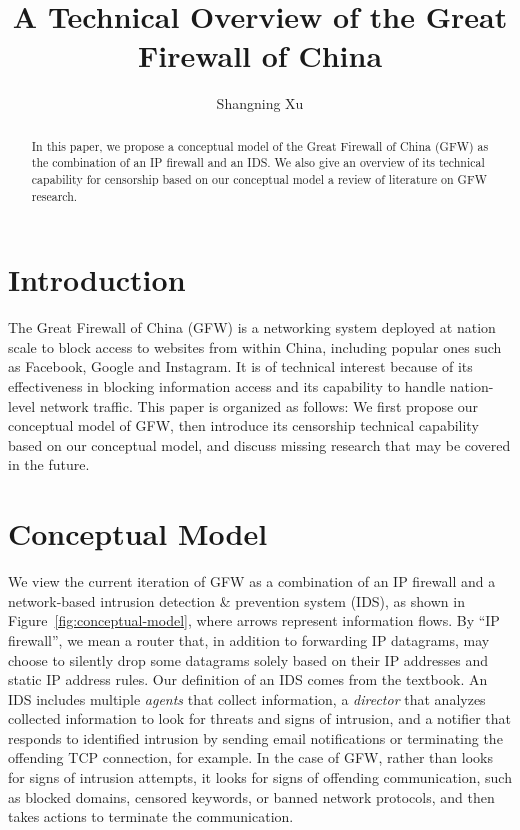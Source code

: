 \documentclass[sigconf, screen, balance=false]{acmart}
\title{A Technical Overview of the Great Firewall of China}
\author{Shangning Xu}
\begin{document}
\begin{abstract}
    In this paper, we propose a conceptual model of the Great Firewall of China (GFW) as the combination of an IP firewall and an IDS. We also give an overview of its technical capability for censorship based on our conceptual model a review of literature on GFW research.
\end{abstract}

\maketitle

\section{Introduction}

The Great Firewall of China (GFW) is a networking system deployed at nation scale to block access to websites from within China, including popular ones such as Facebook, Google and Instagram. It is of technical interest because of its effectiveness in blocking information access and its capability to handle nation-level network traffic. This paper is organized as follows: We first propose our conceptual model of GFW, then introduce its censorship technical capability based on our conceptual model, and discuss missing research that may be covered in the future.

\section{Conceptual Model}

We view the current iteration of GFW as a combination of an IP firewall and a network-based intrusion detection \& prevention system (IDS), as shown in Figure~\ref{fig:conceptual-model}, where arrows represent information flows. By ``IP firewall'', we mean a router that, in addition to forwarding IP datagrams, may choose to silently drop some datagrams solely based on their IP addresses and static IP address rules. Our definition of an IDS comes from the textbook. An IDS includes multiple \emph{agents} that collect information, a \emph{director} that analyzes collected information to look for threats and signs of intrusion, and a notifier that responds to identified intrusion by sending email notifications or terminating the offending TCP connection, for example. In the case of GFW, rather than looks for signs of intrusion attempts, it looks for signs of offending communication, such as blocked domains, censored keywords, or banned network protocols, and then takes actions to terminate the communication.
\end{document}
